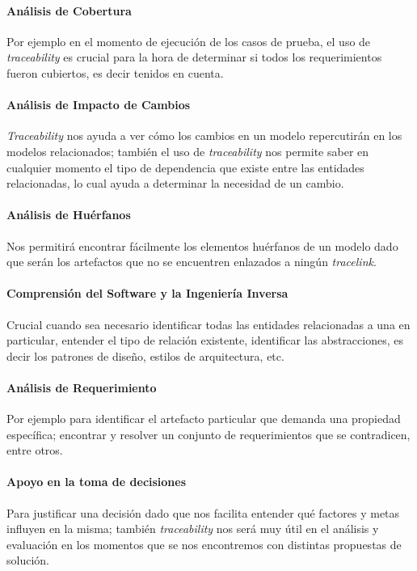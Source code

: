 \documentclass[a4paper,12pt,oneside,spanish]{book}
\begin{document}
\paragraph{Análisis de Cobertura} Por ejemplo en el momento de ejecución de los casos de prueba, el uso de \textit{traceability} es crucial para la hora de determinar si todos los requerimientos fueron cubiertos, es decir tenidos en cuenta.

\paragraph{Análisis de Impacto de Cambios} \textit{Traceability} nos ayuda a ver cómo los cambios en un modelo repercutirán en los modelos relacionados; también el uso de \textit{traceability} nos permite saber en cualquier momento el tipo de dependencia que existe entre las entidades relacionadas, lo cual ayuda a determinar la necesidad de un cambio.

\paragraph{Análisis de Huérfanos} Nos permitirá encontrar fácilmente los elementos huérfanos de un modelo dado que serán los artefactos que no se encuentren enlazados a ningún \textit{tracelink}.

\paragraph{Comprensión del Software y la Ingeniería Inversa} Crucial cuando sea necesario identificar todas las entidades relacionadas a una en particular, entender el tipo de relación existente, identificar las abstracciones, es decir los patrones de diseño, estilos de arquitectura, etc.

\paragraph{Análisis de Requerimiento} Por ejemplo para identificar el artefacto particular que demanda una propiedad específica; encontrar y resolver un conjunto de requerimientos que se contradicen, entre otros.

\paragraph{Apoyo en la toma de decisiones} Para justificar una decisión dado que nos facilita entender qué factores y metas influyen en la misma; también \textit{traceability} nos será muy útil en el análisis y evaluación en los momentos que se nos encontremos con distintas propuestas de solución.
\end{document}
